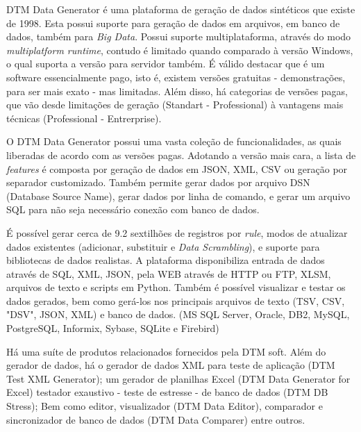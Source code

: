 \documentclass[
	12pt,				%
	openright,			%
	twoside,			%
	a4paper,			%
	english,			%
	brazil				%
	]{abntex2}
\begin{document}
		DTM Data Generator \cite{DTMDataGenerator} é uma plataforma de geração de dados sintéticos que existe de 1998.
		Esta possui suporte para geração de dados em arquivos, em banco de dados, também para \emph{Big Data}.
		Possui suporte multiplataforma, através do modo \emph{multiplatform runtime}, contudo é limitado quando comparado à versão Windows, o qual suporta a versão para servidor também.
		É válido destacar que é um software essencialmente pago, isto é, existem versões gratuitas - demonstrações, para ser mais exato - mas limitadas.
		Além disso, há categorias de versões pagas, que vão desde limitações de geração (Standart - Professional) à vantagens mais técnicas (Professional - Entrerprise).
		\par
		O DTM Data Generator possui uma vasta coleção de funcionalidades, as quais liberadas de acordo com as versões pagas.
		Adotando a versão mais cara, a lista de \emph{features} é composta por geração de dados em JSON, XML, CSV ou geração por separador customizado.
		Também permite gerar dados por arquivo DSN (Database Source Name), gerar dados por linha de comando, e gerar um arquivo SQL para não seja necessário conexão com banco de dados.
		\par
		É possível gerar cerca de 9.2 sextilhões de registros por \emph{rule}, modos de atualizar dados existentes (adicionar, substituir e \emph{Data Scrambling}), e suporte para bibliotecas de dados realistas.
		A plataforma disponibiliza entrada de dados através de SQL, XML, JSON, pela WEB através de HTTP ou FTP, XLSM, arquivos de texto e scripts em Python.
		Também é possível visualizar e testar os dados gerados, bem como gerá-los nos principais arquivos de texto (TSV, CSV, "DSV", JSON, XML) e banco de dados. (MS SQL Server, Oracle, DB2, MySQL, PostgreSQL, Informix, Sybase, SQLite e Firebird) 
		\par
		Há uma suíte de produtos relacionados fornecidos pela DTM soft. 
		Além do gerador de dados, 
			há o gerador de dados XML para teste de aplicação (DTM Test XML Generator);
			um gerador de planilhas Excel (DTM Data Generator for Excel)
			testador exaustivo - teste de estresse - de banco de dados (DTM DB Stress);
			Bem como editor, visualizador (DTM Data Editor), comparador e sincronizador de banco de dados (DTM Data Comparer) entre outros. 
\end{document}
